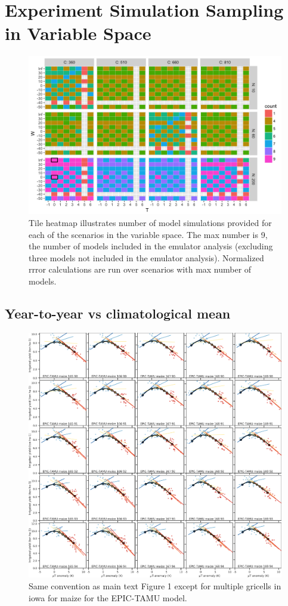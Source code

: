 \documentclass[10pt]{article}
\begin{document}
\clearpage
\section{Experiment Simulation Sampling in Variable Space}
\begin{figure}[h!]
\centering
\includegraphics[width=\textwidth]{s_how_many_simulations.png}
\caption{Tile heatmap illustrates number of model simulations provided for each of the scenarios in the variable space. The max number is 9, the number of models included in the emulator analysis (excluding three models not included in the emulator analysis). Normalized rrror calculations are run over scenarios with max number of models.}
\label{fig:numbersims}
\end{figure}

\clearpage
\subsection{Year-to-year vs climatological mean}
\begin{figure}[h!]
\centering
\includegraphics[width=\textwidth]{tempyearvclim_maize_EPIC-TAMU.png}
\caption{Same convention as main text Figure 1 except for multiple gricells in iowa for maize for the EPIC-TAMU model.}
\label{fig:epicmaize}
\end{figure}
\end{document}
